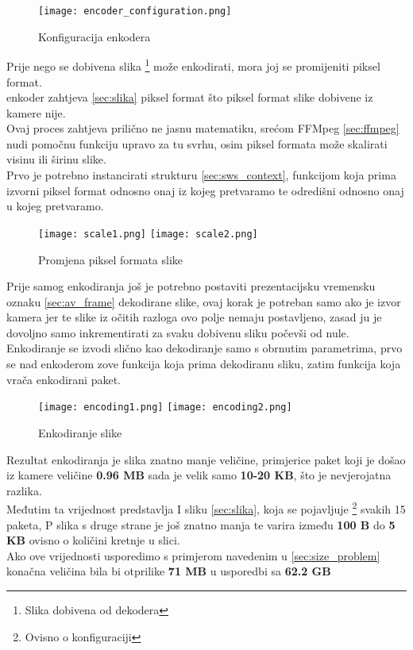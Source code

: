 \begin{figure}[h]
  \texttt{[image: encoder\_configuration.png]}
  \caption{Konfiguracija enkodera}
\end{figure}
\noindent
Prije nego se dobivena slika \footnote{Slika dobivena od dekodera} može enkodirati, mora joj se promijeniti piksel format. \\
 enkoder zahtjeva  \ref{sec:slika} piksel format što piksel format slike dobivene iz 
kamere nije. \\
Ovaj proces zahtjeva prilično ne jasnu matematiku, srećom FFMpeg \ref{sec:ffmpeg} nudi pomočnu
funkciju  upravo za tu svrhu, osim piksel formata može skalirati visinu ili širinu slike. \\
Prvo je potrebno instancirati strukturu  \ref{sec:sws_context}, funkcijom 
koja prima izvorni piksel format odnosno onaj iz kojeg pretvaramo te odredišni odnosno onaj u kojeg pretvaramo.

\begin{figure}[h]
  \texttt{[image: scale1.png]}
  \texttt{[image: scale2.png]}
  \caption{Promjena piksel formata slike}
\end{figure}
\noindent
Prije samog enkodiranja još je potrebno postaviti prezentacijsku vremensku oznaku \ref{sec:av_frame} dekodirane slike,
ovaj korak je potreban samo ako je izvor kamera jer te slike iz očitih razloga ovo polje nemaju postavljeno, zasad ju je
dovoljno samo inkrementirati za svaku dobivenu sliku počevši od nule.
\paraBreak
Enkodiranje se izvodi slično kao dekodiranje samo s obrnutim parametrima, prvo se nad enkoderom zove funkcija
 koja prima dekodiranu sliku, zatim funkcija  koja 
vrača enkodirani paket.

\begin{figure}[h]
  \texttt{[image: encoding1.png]}
  \texttt{[image: encoding2.png]}
  \caption{Enkodiranje slike}
\end{figure}
\noindent
Rezultat enkodiranja je slika znatno manje veličine, primjerice paket koji je došao iz kamere veličine 
\textbf{0.96 MB} sada je velik samo \textbf{10-20 KB}, što je nevjerojatna razlika.\\
Međutim ta vrijednost predstavlja I sliku \ref{sec:slika}, koja se pojavljuje \footnote{Ovisno o konfiguraciji} svakih 15
paketa, P slika s druge strane je još znatno manja te varira između \textbf{100 B} do \textbf{5 KB} ovisno o količini
kretnje u slici. \\
Ako ove vrijednosti usporedimo s primjerom navedenim u \ref{sec:size_problem} konačna veličina bila bi otprilike 
\textbf{71 MB} u usporedbi sa \textbf{62.2 GB}

